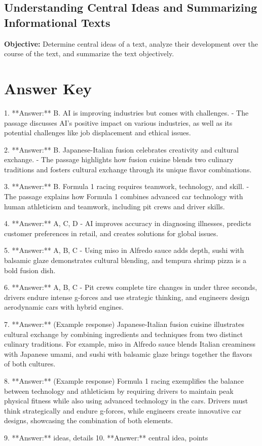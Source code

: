\documentclass[12pt]{article}
\begin{document}
\subsection*{Understanding Central Ideas and Summarizing Informational Texts}
\onehalfspacing

\begin{tcolorbox}[colframe=black!40, colback=gray!0, title=Learning Objective]
\textbf{Objective:} Determine central ideas of a text, analyze their development over the course of the text, and summarize the text objectively.
\end{tcolorbox}


\section*{Answer Key}

1. **Answer:** B. AI is improving industries but comes with challenges.  
   - The passage discusses AI's positive impact on various industries, as well as its potential challenges like job displacement and ethical issues.

2. **Answer:** B. Japanese-Italian fusion celebrates creativity and cultural exchange.  
   - The passage highlights how fusion cuisine blends two culinary traditions and fosters cultural exchange through its unique flavor combinations.

3. **Answer:** B. Formula 1 racing requires teamwork, technology, and skill.  
   - The passage explains how Formula 1 combines advanced car technology with human athleticism and teamwork, including pit crews and driver skills.

4. **Answer:** A, C, D  
   - AI improves accuracy in diagnosing illnesses, predicts customer preferences in retail, and creates solutions for global issues. 

5. **Answer:** A, B, C  
   - Using miso in Alfredo sauce adds depth, sushi with balsamic glaze demonstrates cultural blending, and tempura shrimp pizza is a bold fusion dish.

6. **Answer:** A, B, C  
   - Pit crews complete tire changes in under three seconds, drivers endure intense g-forces and use strategic thinking, and engineers design aerodynamic cars with hybrid engines.

7. **Answer:** (Example response) Japanese-Italian fusion cuisine illustrates cultural exchange by combining ingredients and techniques from two distinct culinary traditions. For example, miso in Alfredo sauce blends Italian creaminess with Japanese umami, and sushi with balsamic glaze brings together the flavors of both cultures.

8. **Answer:** (Example response) Formula 1 racing exemplifies the balance between technology and athleticism by requiring drivers to maintain peak physical fitness while also using advanced technology in the cars. Drivers must think strategically and endure g-forces, while engineers create innovative car designs, showcasing the combination of both elements.

9. **Answer:** ideas, details  
10. **Answer:** central idea, points  
\end{document}
